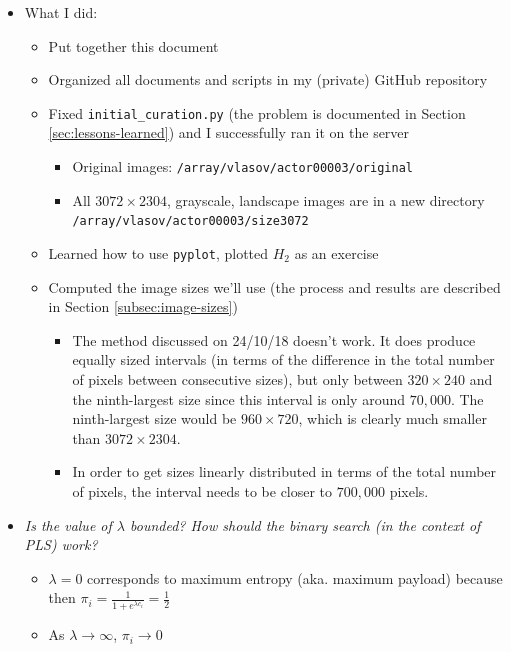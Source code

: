\documentclass[11pt,a4paper]{report}
\begin{document}
\begin{itemize}

\item What I did:
  \begin{itemize}
  \item Put together this document
  \item Organized all documents and scripts in my (private) GitHub repository
  \item Fixed \texttt{initial\_curation.py} (the problem is documented in Section \ref{sec:lessons-learned}) and I successfully ran it on the server
    \begin{itemize}
    \item Original images: \texttt{/array/vlasov/actor00003/original}
    \item All $3072\times2304$, grayscale, landscape images are in a new directory \texttt{/array/vlasov/actor00003/size3072}
    \end{itemize}
  \item Learned how to use \texttt{pyplot}, plotted $H_2$ as an exercise
  \item Computed the image sizes we'll use (the process and results are described in Section \ref{subsec:image-sizes})
    \begin{itemize}
    \item The method discussed on 24/10/18 doesn't work. It does produce equally sized intervals (in terms of the difference in the total number of pixels between consecutive sizes), but only between $320\times240$ and the ninth-largest size since this interval is only around $70,000$. The ninth-largest size would be $960\times720$, which is clearly much smaller than $3072\times2304$.
    \item In order to get sizes linearly distributed in terms of the total number of pixels, the interval needs to be closer to $700,000$ pixels.
    \end{itemize}
  \end{itemize}

\item \textit{Is the value of $\lambda$ bounded? How should the binary search (in the context of PLS) work?}
  \begin{itemize}
  \item $\lambda = 0$ corresponds to maximum entropy (aka. maximum payload) because then $\pi_i = \frac{1}{1+e^{\lambda c_i}} = \frac{1}{2}$

  \item As $\lambda \rightarrow \infty$, $\pi_i \rightarrow 0$


\end{itemize}
\end{itemize}
\end{document}
